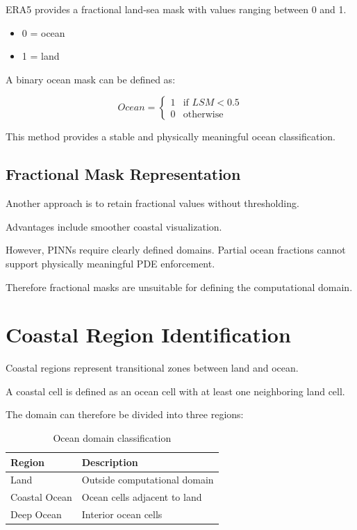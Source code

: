 \documentclass[12pt,a4paper]{article}
\begin{document}
ERA5 provides a fractional land-sea mask with values ranging between 0 and 1.

\begin{itemize}
\item 0 = ocean
\item 1 = land
\end{itemize}

A binary ocean mask can be defined as:

\begin{equation}
Ocean = 
\begin{cases}
1 & \text{if } LSM < 0.5 \\
0 & \text{otherwise}
\end{cases}
\end{equation}

This method provides a stable and physically meaningful ocean classification.

\subsection{Fractional Mask Representation}

Another approach is to retain fractional values without thresholding.

Advantages include smoother coastal visualization.

However, PINNs require clearly defined domains. Partial ocean fractions cannot support physically meaningful PDE enforcement.

Therefore fractional masks are unsuitable for defining the computational domain.

\section{Coastal Region Identification}

Coastal regions represent transitional zones between land and ocean.

A coastal cell is defined as an ocean cell with at least one neighboring land cell.

The domain can therefore be divided into three regions:

\begin{table}[H]
\centering
\begin{tabular}{ll}
\toprule
Region & Description \\
\midrule
Land & Outside computational domain \\
Coastal Ocean & Ocean cells adjacent to land \\
Deep Ocean & Interior ocean cells \\
\bottomrule
\end{tabular}
\caption{Ocean domain classification}
\end{table}
\end{document}
